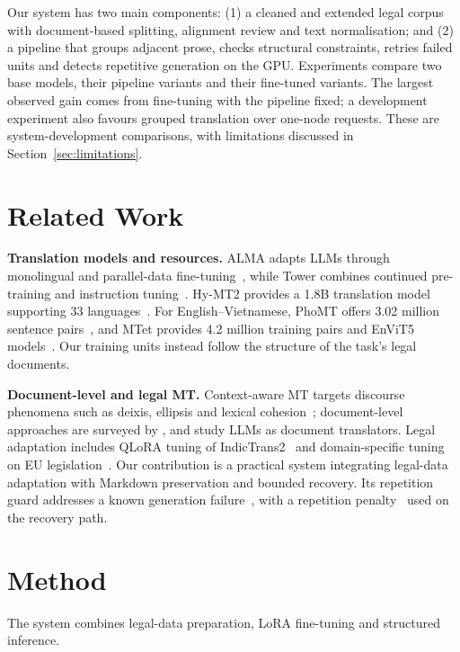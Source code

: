 \documentclass[11pt]{article}
\begin{document}
Our system has two main components: (1) a cleaned and extended legal corpus with document-based splitting, alignment review and text normalisation; and (2) a pipeline that groups adjacent prose, checks structural constraints, retries failed units and detects repetitive generation on the GPU. Experiments compare two base models, their pipeline variants and their fine-tuned variants. The largest observed gain comes from fine-tuning with the pipeline fixed; a development experiment also favours grouped translation over one-node requests. These are system-development comparisons, with limitations discussed in Section~\ref{sec:limitations}.

\section{Related Work}
\textbf{Translation models and resources.} ALMA adapts LLMs through monolingual and parallel-data fine-tuning~\cite{xu2024alma}, while Tower combines continued pre-training and instruction tuning~\cite{alves2024tower}. Hy-MT2 provides a 1.8B translation model supporting 33 languages~\cite{zheng2026hymt2}. For English--Vietnamese, PhoMT offers 3.02 million sentence pairs~\cite{doan2021phomt}, and MTet provides 4.2 million training pairs and EnViT5 models~\cite{ngo2022mtet}. Our training units instead follow the structure of the task's legal documents.

\textbf{Document-level and legal MT.} Context-aware MT targets discourse phenomena such as deixis, ellipsis and lexical cohesion~\cite{voita2019context}; document-level approaches are surveyed by \citet{maruf2021survey}, and \citet{wang2023docllm} study LLMs as document translators. Legal adaptation includes QLoRA tuning of IndicTrans2~\cite{singh2025indictrans2} and domain-specific tuning on EU legislation~\cite{lorini2026eu}. Our contribution is a practical system integrating legal-data adaptation with Markdown preservation and bounded recovery. Its repetition guard addresses a known generation failure~\cite{holtzman2020degeneration}, with a repetition penalty~\cite{keskar2019ctrl} used on the recovery path.

\section{Method}
The system combines legal-data preparation, LoRA fine-tuning and structured inference.
\end{document}
